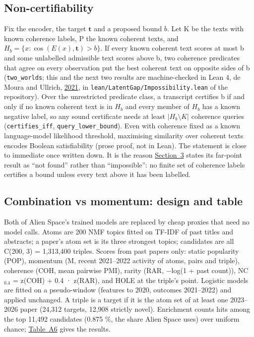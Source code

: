 \documentclass[
  10pt,
]{article}
\begin{document}
\subsection{Non-certifiability}\label{app:A.5}

Fix the encoder, the target
\(\mathbf{t}\) and a proposed bound
\(b\). Let K be the texts with known
coherence labels, P the known coherent
texts, and
\(H_b = \{x : \cos(E(x), \mathbf{t}) > b\}\).
If every known coherent text scores at
most b and some unlabelled admissible
text scores above b, two coherence
predicates that agree on every
observation put the best coherent text
on opposite sides of b
(\texttt{two\_\allowbreak{}worlds}; this
and the next two results are
machine-checked in Lean 4, de Moura and
Ullrich,
\hyperlink{ref-Moura2021}{2021}, in
\texttt{lean/\allowbreak{}LatentGap/\allowbreak{}Impossibility.lean}
of the repository). Over the
unrestricted predicate class, a
transcript certifies b if and only if no
known coherent text is in \(H_b\) and
every member of \(H_b\) has a known
negative label, so any sound certificate
needs at least \(|H_b \setminus K|\)
coherence queries
(\texttt{certifies\_\allowbreak{}iff},
\texttt{query\_\allowbreak{}lower\_\allowbreak{}bound}).
Even with coherence fixed as a known
language-model likelihood threshold,
maximising similarity over coherent
texts encodes Boolean satisfiability
(prose proof, not in Lean). The
statement is close to immediate once
written down. It is the reason
\hyperref[sec:3]{Section~3} states its
far-point result as ``not found'' rather
than ``impossible'': no finite set of
coherence labels certifies a bound
unless every text above it has been
labelled.

\subsection{Combination vs momentum: design and table}\label{app:A.6}

Both of Alien Space's trained models are
replaced by cheap proxies that need no
model calls. Atoms are 200 NMF topics
fitted on TF-IDF of past titles and
abstracts; a paper's atom set is its
three strongest topics; candidates are
all C(200, 3) = 1,313,400 triples.
Scores from past papers only: static
popularity (POP), momentum (M, recent
2021--2022 activity of atoms, pairs and
triple), coherence (COH, mean pairwise
PMI), rarity (RAR, −log(1 + past
count)), NC\(_{0.4}\) = z(COH) + 0.4 ·
z(RAR), and HOLE at the triple's point.
Logistic models are fitted on a
pseudo-window (features to 2020,
outcomes 2021--2022) and applied
unchanged. A triple is a target if it is
the atom set of at least one 2023--2026
paper (24,312 targets, 12,908 strictly
novel). Enrichment counts hits among the
top 11,492 candidates (0.875 \%, the
share Alien Space uses) over uniform
chance; \hyperref[tab:A6]{Table~A6}
gives the results.
\end{document}
